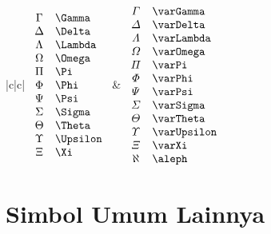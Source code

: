 \begin{table}[htbp]
\centering
\begin{tabular}{|c|c|} \hline
\( \begin{array}{cl}
\Gamma & \verb+\Gamma+ \\
\Delta & \verb+\Delta+ \\
\Lambda & \verb+\Lambda+ \\
\Omega & \verb+\Omega+ \\
\Pi & \verb+\Pi+ \\
\Phi & \verb+\Phi+ \\
\Psi & \verb+\Psi+ \\
\Sigma & \verb+\Sigma+ \\
\Theta & \verb+\Theta+ \\
\Upsilon & \verb+\Upsilon+ \\
\Xi & \verb+\Xi+ \\
\end{array} \)
&
\( \begin{array}{cl}
\varGamma & \verb+\varGamma+ \\
\varDelta & \verb+\varDelta+ \\
\varLambda & \verb+\varLambda+ \\
\varOmega & \verb+\varOmega+ \\
\varPi & \verb+\varPi+ \\
\varPhi & \verb+\varPhi+ \\
\varPsi & \verb+\varPsi+ \\
\varSigma & \verb+\varSigma+ \\
\varTheta & \verb+\varTheta+ \\
\varUpsilon & \verb+\varUpsilon+ \\
\varXi & \verb+\varXi+ \\
\aleph & \verb+\aleph+
\end{array} \)
\\ \hline

\end{tabular}
\end{table}


\section{Simbol Umum Lainnya}
\label{sec:sym}


